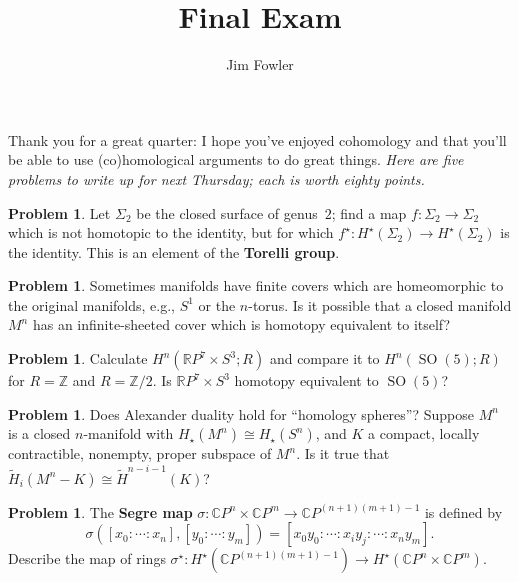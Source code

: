 \documentclass[12pt]{handout}
\title{Final Exam}
\author{Jim Fowler}
\theoremstyle{definition}
\newtheorem{problem}[theorem]{Problem}
\newcommand{\CP}{\mathbb{C}P}
\newcommand{\RP}{\mathbb{R}P}
\newcommand{\Z}{\mathbb{Z}}
\DeclareMathOperator{\SO}{SO}
\begin{document}
\maketitle

Thank you for a great quarter: I hope you've enjoyed cohomology and
that you'll be able to use (co)homological arguments to do great
things.  \textit{Here are five problems to write up for next Thursday;
  each is worth eighty points.}

\begin{problem}
  Let $\Sigma_2$ be the closed surface of genus~$2$; find a map $f :
  \Sigma_2 \to \Sigma_2$ which is not homotopic to the identity, but
  for which $f^\star : H^\star(\Sigma_2) \to H^\star(\Sigma_2)$ is the
  identity.  This is an element of the \textbf{Torelli group}.
\end{problem}

\vfill

\begin{problem}
  Sometimes manifolds have finite covers which are homeomorphic to the
  original manifolds, e.g., $S^1$ or the $n$-torus.  Is it possible
  that a closed manifold $M^n$ has an infinite-sheeted cover which is
  homotopy equivalent to itself?
\end{problem}

\vfill

\begin{problem}
  Calculate $H^n(\RP^7 \times S^3 ; R)$ and compare it to
  $H^n(\SO(5);R)$ for $R = \Z$ and $R = \Z/2$.  Is $\RP^7 \times S^3$
  homotopy equivalent to $\SO(5)$?
\end{problem}

\vfill

\begin{problem}
  Does Alexander duality hold for ``homology spheres''?  Suppose $M^n$
  is a closed $n$-manifold with $H_\star(M^n) \cong H_\star(S^n)$, and
  $K$ a compact, locally contractible, nonempty, proper subspace of
  $M^n$.  Is it true that $\tilde{H}_i(M^n - K) \cong
  \tilde{H}^{n-i-1}(K)$?
\end{problem}

\vfill

\begin{problem}
The \textbf{Segre map} $\sigma : \CP^n \times \CP^m \to \CP^{(n+1)(m+1)-1}$ is defined by
$$
\sigma([x_0 : \cdots : x_n],[y_0 : \cdots : y_m]) = [x_0 y_0 : \cdots : x_i y_j : \cdots : x_n y_m].
$$
Describe the map of rings $\sigma^\star : H^\star(\CP^{(n+1)(m+1)-1})
\to H^\star(\CP^n \times \CP^m)$.
\end{problem}

\pagebreak
\null
\end{document}
